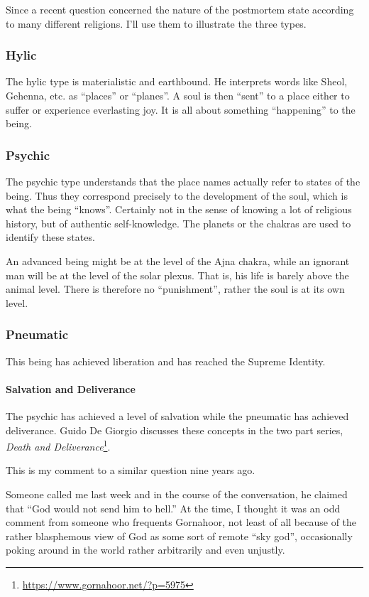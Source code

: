 Since a recent question concerned the nature of the postmortem state according to many different religions. I'll use them to illustrate the three types.

\subsubsection{Hylic}


The hylic type is materialistic and earthbound. He interprets words like Sheol, Gehenna, etc. as ``places'' or ``planes''. A soul is then ``sent'' to a place either to suffer or experience everlasting joy. It is all about something ``happening'' to the being.

\subsubsection{Psychic}


The psychic type understands that the place names actually refer to states of the being. Thus they correspond precisely to the development of the soul, which is what the being ``knows''. Certainly not in the sense of knowing a lot of religious history, but of authentic self-knowledge. The planets or the chakras are used to identify these states.

An advanced being might be at the level of the Ajna chakra, while an ignorant man will be at the level of the solar plexus. That is, his life is barely above the animal level. There is therefore no ``punishment'', rather the soul is at its own level.

\subsubsection{Pneumatic}


This being has achieved liberation and has reached the Supreme Identity.

\paragraph{Salvation and Deliverance}


The psychic has achieved a level of salvation while the pneumatic has achieved deliverance. Guido De Giorgio discusses these concepts in the two part series, \textit{Death and Deliverance}\footnote{\url{https://www.gornahoor.net/?p=5975}}.

This is my comment to a similar question nine years ago.

Someone called me last week and in the course of the conversation, he claimed that ``God would not send him to hell.'' At the time, I thought it was an odd comment from someone who frequents Gornahoor, not least of all because of the rather blasphemous view of God as some sort of remote ``sky god'', occasionally poking around in the world rather arbitrarily and even unjustly.

